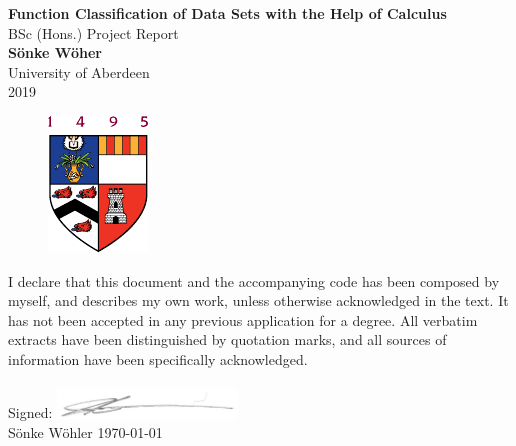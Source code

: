 \documentclass[main.tex]{subfiles}
\begin{document}
  \begin{titlepage}
  \begin{center}
    \vspace*{2.0cm}
    
    \huge
    \textbf{Function Classification of Data Sets with the Help of Calculus} \\
    \LARGE
    BSc (Hons.) Project Report    \\
    \vspace{1.5cm}
    \Large
    \textbf{S\"onke W\"oher}\\
    \large
    University of Aberdeen     \\
    \vspace{1.5cm}
    2019
    
    
    \begin{figure}[h!]
      \centering
      \includegraphics{otherImages/abdnshield}
      \caption*{}
    \end{figure}
    
    \vfill
  \end{center}
  I declare that this document and the accompanying code has been composed by myself, and describes my own work, unless otherwise acknowledged in the text. It has not been accepted in any previous application for a degree. All verbatim extracts have been distinguished by quotation marks, and all sources of information have been specifically acknowledged.
  \\\\
  Signed: 
  \hfill \includegraphics[height=0.78cm]{otherImages/sonkiSignature}\hspace{2.5cm}
  \\
  S\"onke W\"ohler \hfil \today
\end{titlepage} 
\end{document}
